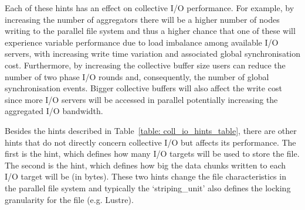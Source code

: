 Each of these hints has an effect on collective I/O performance. For example, by increasing the number of aggregators there will be a higher number of nodes writing to the parallel file system and thus a higher chance that one of these will experience variable performance due to load imbalance among available I/O servers, with increasing write time variation and associated global synchronisation cost. Furthermore, by increasing the collective buffer size users can reduce the number of two phase I/O rounds and, consequently, the number of global synchronisation events. Bigger collective buffers will also affect the write cost since more I/O servers will be accessed in parallel potentially increasing the aggregated I/O bandwidth.

Besides the hints described in Table~\ref{table: coll_io_hints_table}, there are other hints that do not directly concern collective I/O but affects its performance. The first is the  hint, which defines how many I/O targets will be used to store the file. The second is the  hint, which defines how big the data chunks written to each I/O target will be (in bytes). These two hints change the file characteristics in the parallel file system and typically the `striping\_unit' also defines the locking granularity for the file (e.g. Lustre).


